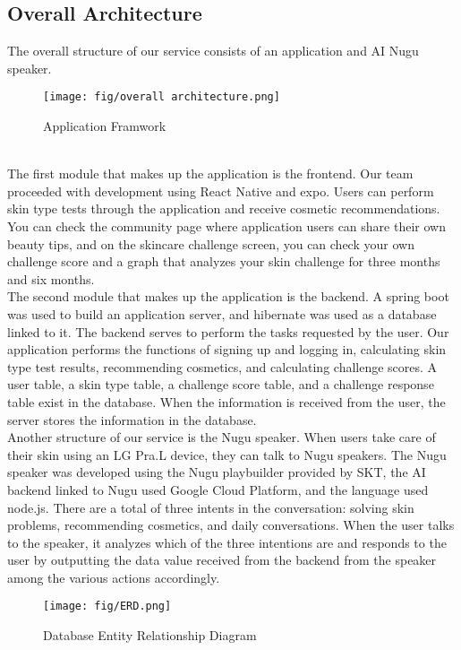 \documentclass[conference]{IEEEtran}
\begin{document}
\subsection{Overall Architecture}
The overall structure of our service consists of an application and AI Nugu speaker. \\ 
\begin{figure}[h]
    \centering
    \texttt{[image: fig/overall architecture.png]}
    \label{fig:Application Framwork}
    \caption{Application Framwork} 
    \end{figure} \\ 
\indent The first module that makes up the application is the frontend. Our team proceeded with development using React Native and expo. Users can perform skin type tests through the application and receive cosmetic recommendations. You can check the community page where application users can share their own beauty tips, and on the skincare challenge screen, you can check your own challenge score and a graph that analyzes your skin challenge for three months and six months.\\

The second module that makes up the application is the backend. A spring boot was used to build an application server, and hibernate was used as a database linked to it. The backend serves to perform the tasks requested by the user. Our application performs the functions of signing up and logging in, calculating skin type test results, recommending cosmetics, and calculating challenge scores. A user table, a skin type table, a challenge score table, and a challenge response table exist in the database. When the information is received from the user, the server stores the information in the database.\\

Another structure of our service is the Nugu speaker. When users take care of their skin using an LG Pra.L device, they can talk to Nugu speakers. The Nugu speaker was developed using the Nugu playbuilder provided by SKT, the AI backend linked to Nugu used Google Cloud Platform, and the language used node.js. There are a total of three intents in the conversation: solving skin problems, recommending cosmetics, and daily conversations. When the user talks to the speaker, it analyzes which of the three intentions are and responds to the user by outputting the data value received from the backend from the speaker among the various actions accordingly.

\begin{figure}[h]
    \centering
    \texttt{[image: fig/ERD.png]}
    \label{fig:Database Entity Relationship Diagram}
    \caption{Database Entity Relationship Diagram} 
    \end{figure}
\end{document}
